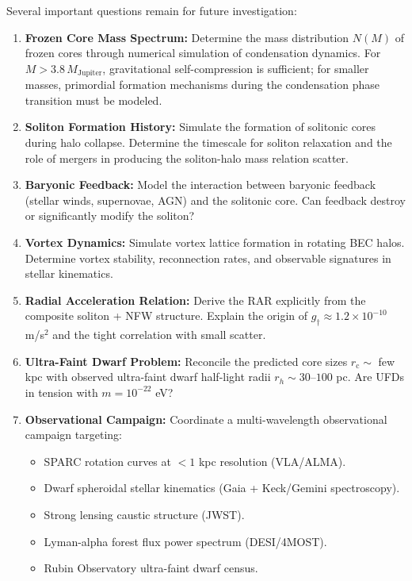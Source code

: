 \documentclass[11pt,a4paper]{article}
\newcommand{\rc}{\ensuremath{r_{\mathrm{c}}}}
\newcommand{\gdagger}{\ensuremath{g_{\dagger}}}
\theoremstyle{definition}
\theoremstyle{remark}
\begin{document}
Several important questions remain for future investigation:

\begin{enumerate}[leftmargin=*, itemsep=0.3em]

\item \textbf{Frozen Core Mass Spectrum:} Determine the mass distribution $N(M)$ of frozen cores through numerical simulation of condensation dynamics. For $M > 3.8\,M_{\mathrm{Jupiter}}$, gravitational self-compression is sufficient; for smaller masses, primordial formation mechanisms during the condensation phase transition must be modeled.

\item \textbf{Soliton Formation History:} Simulate the formation of solitonic cores during halo collapse. Determine the timescale for soliton relaxation and the role of mergers in producing the soliton-halo mass relation scatter.

\item \textbf{Baryonic Feedback:} Model the interaction between baryonic feedback (stellar winds, supernovae, AGN) and the solitonic core. Can feedback destroy or significantly modify the soliton?

\item \textbf{Vortex Dynamics:} Simulate vortex lattice formation in rotating BEC halos. Determine vortex stability, reconnection rates, and observable signatures in stellar kinematics.

\item \textbf{Radial Acceleration Relation:} Derive the RAR explicitly from the composite soliton + NFW structure. Explain the origin of $\gdagger \approx 1.2 \times 10^{-10}$ m/s$^2$ and the tight correlation with small scatter.

\item \textbf{Ultra-Faint Dwarf Problem:} Reconcile the predicted core sizes $\rc \sim$ few kpc with observed ultra-faint dwarf half-light radii $r_h \sim 30$--$100$ pc. Are UFDs in tension with $m = 10^{-22}$ eV?

\item \textbf{Observational Campaign:} Coordinate a multi-wavelength observational campaign targeting:
\begin{itemize}[leftmargin=*]
\item SPARC rotation curves at $<1$ kpc resolution (VLA/ALMA).
\item Dwarf spheroidal stellar kinematics (Gaia + Keck/Gemini spectroscopy).
\item Strong lensing caustic structure (JWST).
\item Lyman-alpha forest flux power spectrum (DESI/4MOST).
\item Rubin Observatory ultra-faint dwarf census.
\end{itemize}
\end{enumerate}
\end{document}
